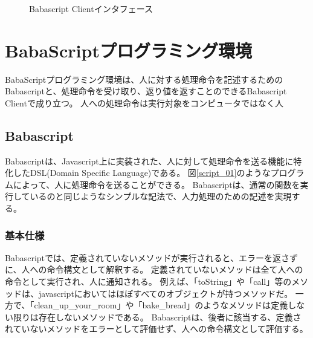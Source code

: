 \documentclass[twoside]{wiss}
\begin{document}
\begin{figure}[!h]  
  \centering
  \caption{Babascript Clientインタフェース}
  \label{webapp-interface}
\end{figure}

\section{BabaScriptプログラミング環境}
BabaScriptプログラミング環境は、人に対する処理命令を記述するためのBabascriptと、処理命令を受け取り、返り値を返すことのできるBabascript Clientで成り立つ。
人への処理命令は実行対象をコンピュータではなく人

\subsection{Babascript}

Babascriptは、Javascript上に実装された、人に対して処理命令を送る機能に特化したDSL(Domain Specific Language)である。
図\ref{script_01}のようなプログラムによって、人に処理命令を送ることができる。
Babascriptは、通常の関数を実行しているのと同じようなシンプルな記法で、人力処理のための記述を実現する。

\subsubsection{基本仕様}

Babascriptでは、定義されていないメソッドが実行されると、エラーを返さずに、人への命令構文として解釈する。
定義されていないメソッドは全て人への命令として実行され、人に通知される。
例えば、「toString」や「call」等のメソッドは、javascriptにおいてはほぼすべてのオブジェクトが持つメソッドだ。
一方で、「clean\_up\_your\_room」や「bake\_bread」のようなメソッドは定義しない限りは存在しないメソッドである。
Babascriptは、後者に該当する、定義されていないメソッドをエラーとして評価せず、人への命令構文として評価する。
\end{document}
